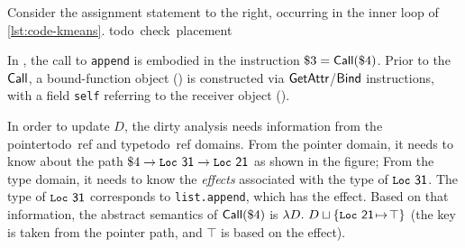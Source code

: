 \begin{example}
Consider the assignment statement to the right,
occurring in the inner loop of \cref{lst:code-kmeans}.
\si{todo check placement}
\end{example}

\bgroup
\setlength\intextsep{-10pt}
\begin{wrapfigure}{r}{0.3\textwidth}
\vspace{5pt}
\end{wrapfigure}

%
In \spytecode, the call to \lstinline|append| is embodied
in the instruction $\$3 = \textsf{Call}(\$4)$.
Prior to the $\textsf{Call}$, a bound-function object () is
constructed via $\textsf{GetAttr}$/$\textsf{Bind}$ instructions, with a field
\lstinline|self| referring to the receiver object ().

In order to update $D$, the dirty analysis needs information from the pointer\si{todo ref} and type\si{todo ref} domains.
From the pointer domain, it needs to know about the path $\$4\to\textsf{\texttt{\small Loc}~{31}} \to \textsf{\texttt{\small Loc}~{21}}$
as shown in the figure;
From the type domain, it needs to know the \emph{effects}
associated with the type of $\textsf{\texttt{\small Loc}~{31}}$.
The type of $\textsf{\texttt{\small Loc}~{31}}$ corresponds to \texttt{list.append},
which has the \tupdate effect.
Based on that information, the abstract semantics of
$\textsf{Call}(\$4)$ is $\lambda D.~D\sqcup\{\textsf{\texttt{\small Loc}~{21}}{\hspace{1pt}\mapsto\hspace{1pt}}\top\}$ (the key  is taken from the pointer path, and $\top$ is based on the \tupdate
effect).

